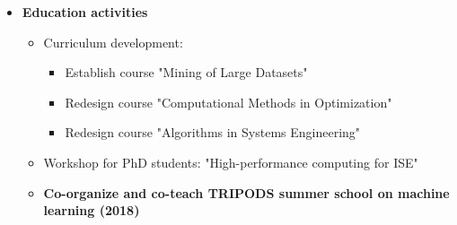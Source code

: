 \documentclass[11pt]{article}
\newcommand{\0}{ {\bf 0}}
\begin{document}
\begin{itemize}[noitemsep,topsep=0pt]
\begin{itemize}[noitemsep,topsep=0pt]
\begin{itemize}  [noitemsep,topsep=0pt]
\item The International Symposium on Mathematical Programming 2018, France


\item DIMACS/TRIOPDS/MOPTA 2018 - Modeling and Optimization: Theory and Application, 2018, Bethlehem, PA


\item MOPTA 2017 - Modeling and Optimization: Theory and Application, 2017, Bethlehem, PA

\item SIAM Conference on Optimization, 2017, Vancouver, Canada



\item 
5th International Conference on Continuous Optimization 2016, Tokyo, Japan
\item 
28th European Conference
on Operational Research (EURO 2016),  2016, Poznan, Poland



\item The International Symposium on Mathematical Programming 2015, Pittsburgh, PA


\item INFORMS Annual Meeting,  2014, San Francisco, CA


 

\item 
4th International Conference on Continuous Optimization 2013, Lisbon, Portugal
\item 25th Biennial Numerical Analysis Conference, 2013, Glasgow, UK
\end{itemize}

\end{itemize}

\item {\bf\color{color1}Education activities} 
 \begin{itemize}  [noitemsep,topsep=0pt]
\setlength\itemsep{0.1em}
\item Curriculum development:
 \begin{itemize}  [noitemsep,topsep=0pt]
\item Establish course "Mining of Large Datasets"
\item Redesign course "Computational Methods in Optimization"
\item Redesign course "Algorithms in Systems Engineering"
\end{itemize}
\item Workshop for PhD students:
"High-performance computing for ISE"
\item {\bf Co-organize and co-teach TRIPODS  summer school on machine learning (2018)}


\end{itemize}
\end{itemize}
\end{document}
